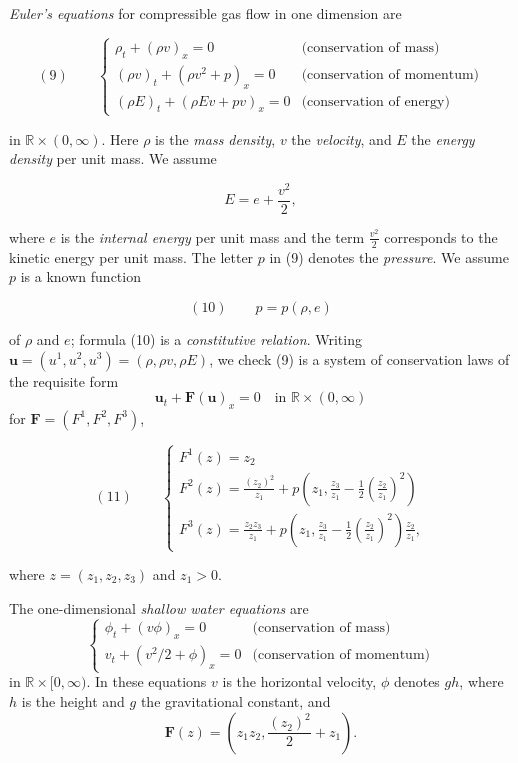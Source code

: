 \begin{example}
\label{ex:euler-equations-1d-system}
\textit{Euler's equations} for compressible gas flow in one dimension are

$$(9) \qquad \begin{cases} \rho_t + (\rho v)_x = 0 & \text{(conservation of mass)} \\ (\rho v)_t + (\rho v^2+p)_x = 0 & \text{(conservation of momentum)} \\ (\rho E)_t + (\rho E v + pv)_x = 0 & \text{(conservation of energy)} \end{cases}$$

in $\mathbb{R}\times(0,\infty)$. Here $\rho$ is the \textit{mass density}, $v$ the \textit{velocity}, and $E$ the \textit{energy density} per unit mass. We assume

$$E = e + \frac{v^2}{2},$$

where $e$ is the \textit{internal energy} per unit mass and the term $\frac{v^2}{2}$ corresponds to the kinetic energy per unit mass. The letter $p$ in (9) denotes the \textit{pressure}. We assume $p$ is a known function

$$(10) \qquad p = p(\rho,e)$$

of $\rho$ and $e$; formula (10) is a \textit{constitutive relation}. Writing $\mathbf{u}=(u^1,u^2,u^3)=(\rho,\rho v,\rho E)$, we check (9) is a system of conservation laws of the requisite form
$$\mathbf{u}_t + \mathbf{F}(\mathbf{u})_x = 0 \quad \text{in } \mathbb{R}\times(0,\infty)$$
for $\mathbf{F}=(F^1,F^2,F^3)$,

$$(11) \qquad \begin{cases} F^1(z) = z_2 \\ F^2(z) = \frac{(z_2)^2}{z_1} + p\left(z_1, \frac{z_3}{z_1} - \frac{1}{2}\left(\frac{z_2}{z_1}\right)^2\right) \\ F^3(z) = \frac{z_2 z_3}{z_1} + p\left(z_1, \frac{z_3}{z_1} - \frac{1}{2}\left(\frac{z_2}{z_1}\right)^2\right)\frac{z_2}{z_1}, \end{cases}$$

where $z=(z_1,z_2,z_3)$ and $z_1 > 0$.
\end{example}

\begin{example}
\label{ex:shallow-water-equations}
The one-dimensional \textit{shallow water equations} are
$$\begin{cases} \phi_t + (v\phi)_x = 0 & \text{(conservation of mass)} \\ v_t + (v^2/2+\phi)_x = 0 & \text{(conservation of momentum)} \end{cases}$$
in $\mathbb{R}\times[0,\infty)$. In these equations $v$ is the horizontal velocity, $\phi$ denotes $gh$, where $h$ is the height and $g$ the gravitational constant, and
$$\mathbf{F}(z) = \left(z_1z_2, \frac{(z_2)^2}{2} + z_1\right).$$
\end{example}

